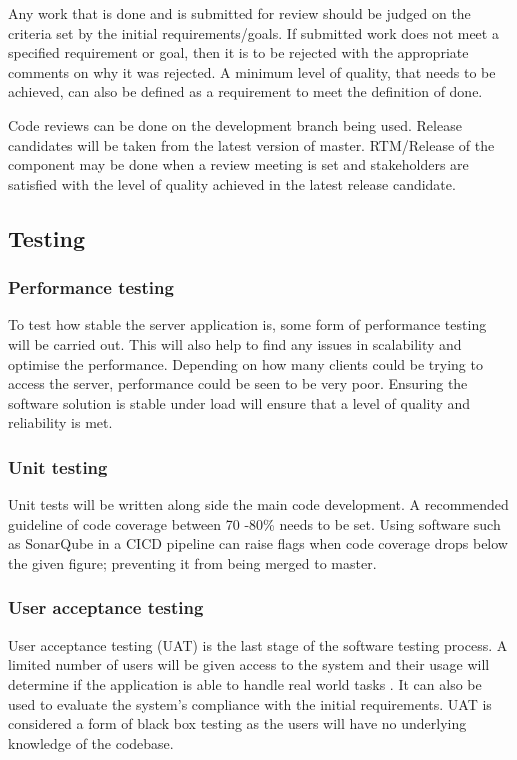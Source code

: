 Any work that is done and is submitted for review should be judged on the criteria set by the initial
requirements/goals. If submitted work does not meet a specified requirement or goal, then it is to
be rejected with the appropriate comments on why it was rejected. A minimum level of quality, that
needs to be achieved, can also be defined as a requirement to meet the definition of done.

Code reviews can be done on the development branch being used. Release candidates will be taken
from the latest version of master. RTM/Release of the component may be done when a review
meeting is set and stakeholders are satisfied with the level of quality achieved in the latest release
candidate.

\subsection{Testing}
\subsubsection{Performance testing }
To test how stable the server application is, some form of performance testing will be carried out. 
This will also help to find any issues in scalability and optimise the performance. 
Depending on how many clients could be trying to access the server, performance could be seen to be very poor.
Ensuring the software solution is stable under load will ensure that a level of quality and reliability is met.

\subsubsection{Unit testing}
Unit tests will be written along side the main code development. 
A recommended guideline of code coverage between 70 -80\% \cite{cornett2006codecoverage} needs to be set. 
Using software such as SonarQube \cite{sonarqube2017} in a CICD pipeline can raise flags when code coverage drops below the given figure; preventing it 
from being merged to master.

\subsubsection{User acceptance testing}
User acceptance testing (UAT) is the last stage of the software testing process.
A limited number of users will be given access to the system and their usage will determine if the application is able to handle real world 
tasks \cite{techopedia2018uat}.
It can also  be used to evaluate the system's compliance with the initial requirements.
UAT is considered a form of black box testing as the users will have no underlying knowledge of the codebase.

